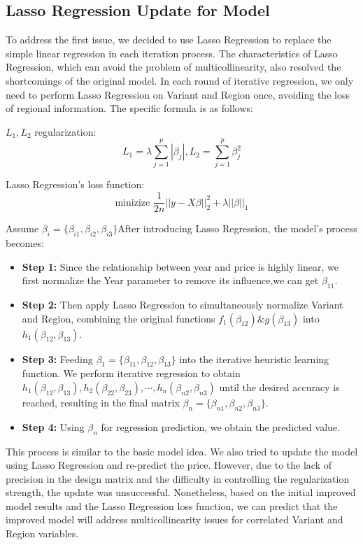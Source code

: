 \documentclass[12pt]{article}  %
\begin{document}
\subsection{Lasso Regression Update for Model}
To address the first issue, we decided to use Lasso Regression to replace the simple linear regression in each iteration process. The characteristics of Lasso Regression, which can avoid the problem of multicollinearity, also resolved the shortcomings of the original model. In each round of iterative regression, we only need to perform Lasso Regression on Variant and Region once, avoiding the loss of regional information. The specific formula is as follows:

$L_1,L_2$ regularization:
$$L_1=\lambda\sum_{j=1}^{p}|\beta_j|,L_2=\sum_{j=1}^{p}\beta_j^2$$

Lasso Regression's loss function:
$$\text{minizize }\frac{1}{2n}||y-X\beta||_2^2+\lambda||\beta||_1$$

Assume $\beta_i=\{\beta_{i1},\beta_{i2},\beta_{i3}\}$After introducing Lasso Regression, the model's process becomes:
\begin{itemize}
    \item \textbf{Step 1:} Since the relationship between year and price is highly linear, we first normalize the Year parameter to remove its influence,we can get $\beta_{11}$.
    \item \textbf{Step 2:} Then apply Lasso Regression to simultaneously normalize Variant and Region, combining the original functions $f_1(\beta_{12})\&g(\beta_{13})$ into $h_1(\beta_{12},\beta_{13})$.
    \item \textbf{Step 3:} Feeding $\beta_1=\{\beta_{11},\beta_{12},\beta_{13}\}$ into the iterative heuristic learning function. We perform iterative regression to obtain $h_1(\beta_{12},\beta_{13}),h_2(\beta_{22},\beta_{23}),\cdots,h_n(\beta_{n2},\beta_{n3})$ until the desired accuracy is reached, resulting in the final matrix $\beta_n=\{\beta_{n1},\beta_{n2},\beta_{n3}\}$.
    \item \textbf{Step 4:} Using $\beta_n$ for regression prediction, we obtain the predicted value.
\end{itemize}

This process is similar to the basic model idea. We also tried to update the model using Lasso Regression and re-predict the price. However, due to the lack of precision in the design matrix and the difficulty in controlling the regularization strength, the update was unsuccessful. Nonetheless, based on the initial improved model results and the Lasso Regression loss function, we can predict that the improved model will address multicollinearity issues for correlated Variant and Region variables.
\end{document}
